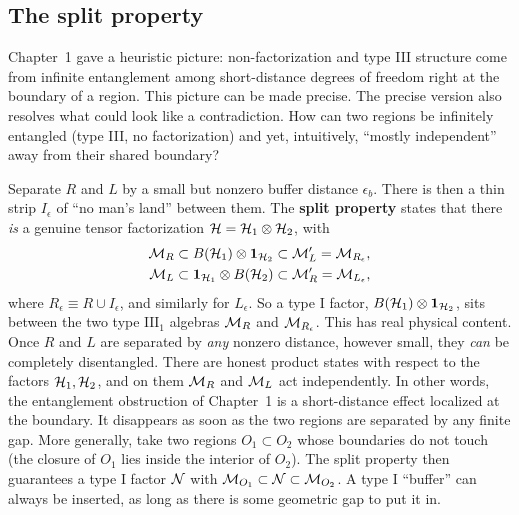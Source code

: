 \subsection*{The split property}

Chapter~1 gave a heuristic picture: non-factorization and type III structure come from infinite entanglement
among short-distance degrees of freedom right at the boundary of a region. This picture can be made precise.
The precise version also resolves what could look like a contradiction. How can two regions be infinitely
entangled (type III, no factorization) and yet, intuitively, ``mostly independent'' away from their shared
boundary?

Separate $R$ and $L$ by a small but nonzero buffer distance $\epsilon_b$. There is then a thin strip
$I_\epsilon$ of ``no man's land'' between them. The \textbf{split property} states that there \emph{is} a
genuine tensor factorization $\mathcal{H}=\mathcal{H}_1\otimes\mathcal{H}_2$, with
\[
\begin{aligned}
\mathcal{M}_R &\subset B(\mathcal{H}_1)\otimes\mathbf{1}_{\mathcal{H}_2} \subset \mathcal{M}_L' = \mathcal{M}_{R_\epsilon}, \\
\mathcal{M}_L &\subset \mathbf{1}_{\mathcal{H}_1}\otimes B(\mathcal{H}_2) \subset \mathcal{M}_R' = \mathcal{M}_{L_\epsilon} ,
\end{aligned}
\]
where $R_\epsilon\equiv R\cup I_\epsilon$, and similarly for $L_\epsilon$. So a type I factor,
$B(\mathcal{H}_1)\otimes\mathbf{1}_{\mathcal{H}_2}$, sits between the two type $\mathrm{III}_1$ algebras $\mathcal{M}_R$ and $\mathcal{M}_{R_\epsilon}$.
This has real physical content. Once $R$ and $L$ are separated by \emph{any} nonzero distance, however small,
they \emph{can} be completely disentangled. There are honest product states with respect to the factors
$\mathcal{H}_1,\mathcal{H}_2$, and on them $\mathcal{M}_R$ and $\mathcal{M}_L$ act independently. In other words, the entanglement obstruction of
Chapter~1 is a short-distance effect localized at the boundary. It disappears as soon as the two regions are
separated by any finite gap. More generally, take two regions $O_1\subset O_2$ whose boundaries do not touch
(the closure of $O_1$ lies inside the interior of $O_2$). The split property then guarantees a type I factor
$\mathcal{N}$ with $\mathcal{M}_{O_1}\subset\mathcal{N}\subset\mathcal{M}_{O_2}$. A type I ``buffer'' can always be inserted, as long as there is
some geometric gap to put it in.

